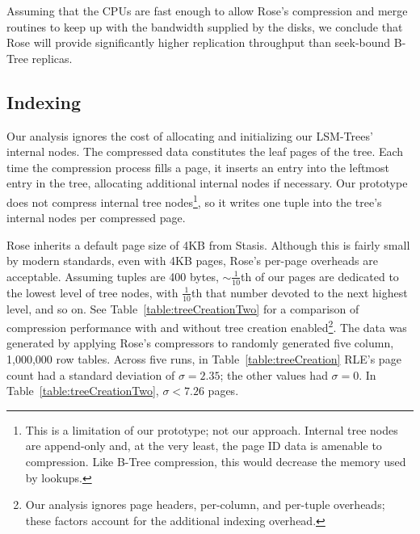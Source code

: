 \documentclass{vldb}
\newcommand{\rows}{Rose\xspace}
\newcommand{\rowss}{Rose's\xspace}
\begin{document}
Assuming that the CPUs are fast enough to allow \rowss
compression and merge routines to keep up with the bandwidth supplied
by the disks, we conclude that \rows will provide significantly higher
replication throughput than seek-bound B-Tree replicas.

\subsection{Indexing}

Our analysis ignores the cost of allocating and initializing our
LSM-Trees' internal nodes.  The compressed data constitutes the leaf
pages of the tree.  Each time the compression process fills a page, it
inserts an entry into the leftmost entry in the tree, allocating
additional internal nodes if necessary.  Our prototype does not compress
internal tree nodes\footnote{This is a limitation of our prototype;
  not our approach.  Internal tree nodes are append-only and, at the
  very least, the page ID data is amenable to compression. Like B-Tree
  compression, this would decrease the memory used by lookups.},
so it writes one tuple into the tree's internal nodes per compressed
page.

\rows inherits a default page size of 4KB from Stasis.
Although this is fairly small by modern standards, even with
4KB pages, \rowss per-page overheads are acceptable.  Assuming tuples
are 400 bytes, $\sim\frac{1}{10}$th of our pages are dedicated to the
lowest level of tree nodes, with $\frac{1}{10}$th that number devoted
to the next highest level, and so on.  See
Table~\ref{table:treeCreationTwo} for a comparison of compression
performance with and without tree creation enabled\footnote{Our
  analysis ignores page headers, per-column, and per-tuple overheads;
  these factors account for the additional indexing overhead.}.  The
data was generated by applying \rowss compressors to randomly
generated five column, 1,000,000 row tables.  Across five runs, in
Table~\ref{table:treeCreation} RLE's page count had a standard
deviation of $\sigma=2.35$; the other values had $\sigma=0$.  In
Table~\ref{table:treeCreationTwo}, $\sigma < 7.26$ pages.

\end{document}

